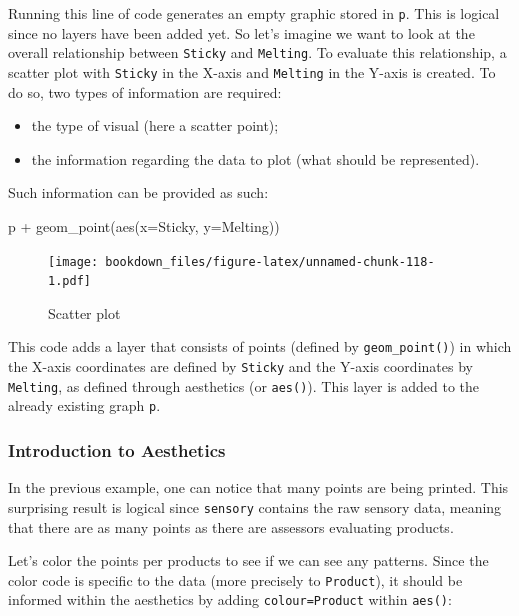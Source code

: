 \documentclass[
]{krantz}
\makeatletter
\newenvironment{Shaded}{\begin{snugshade}}{\end{snugshade}}
\newcommand{\AttributeTok}[1]{\textcolor[rgb]{0.61,0.61,0.61}{#1}}
\newcommand{\FunctionTok}[1]{\textcolor[rgb]{0,0,0}{#1}}
\newcommand{\NormalTok}[1]{#1}
\newcommand{\SpecialCharTok}[1]{\textcolor[rgb]{0,0,0}{#1}}
\providecommand{\tightlist}{%
  \setlength{\itemsep}{0pt}\setlength{\parskip}{0pt}}
\newenvironment{kframe}{%
\medskip{}
\setlength{\fboxsep}{.8em}
 \def\at@end@of@kframe{}%
 \ifinner\ifhmode%
  \def\at@end@of@kframe{\end{minipage}}%
  \begin{minipage}{\columnwidth}%
 \fi\fi%
 \def\FrameCommand##1{\hskip\@totalleftmargin \hskip-\fboxsep
 \colorbox{shadecolor}{##1}\hskip-\fboxsep
     \hskip-\linewidth \hskip-\@totalleftmargin \hskip\columnwidth}%
 \MakeFramed {\advance\hsize-\width
   \@totalleftmargin\z@ \linewidth\hsize
   \@setminipage}}%
 {\par\unskip\endMakeFramed%
 \at@end@of@kframe}
\renewenvironment{Shaded}{\begin{kframe}}{\end{kframe}}
\makeatother
\begin{document}
Running this line of code generates an empty graphic stored in \texttt{p}. This is logical since no layers have been added yet.
So let's imagine we want to look at the overall relationship between \texttt{Sticky} and \texttt{Melting}. To evaluate this relationship, a scatter plot with \texttt{Sticky} in the X-axis and \texttt{Melting} in the Y-axis is created. To do so, two types of information are required:

\begin{itemize}
\tightlist
\item
  the type of visual (here a scatter point);
\item
  the information regarding the data to plot (what should be represented).
\end{itemize}

Such information can be provided as such:

\begin{Shaded}
\begin{Highlighting}[]
\NormalTok{p }\SpecialCharTok{+} \FunctionTok{geom\_point}\NormalTok{(}\FunctionTok{aes}\NormalTok{(}\AttributeTok{x=}\NormalTok{Sticky, }\AttributeTok{y=}\NormalTok{Melting))}
\end{Highlighting}
\end{Shaded}

\begin{figure}
\centering
\texttt{[image: bookdown\_files/figure-latex/unnamed-chunk-118-1.pdf]}
\caption{\label{fig:unnamed-chunk-118}Scatter plot}
\end{figure}

This code adds a layer that consists of points (defined by \texttt{geom\_point()}) in which the X-axis coordinates are defined by \texttt{Sticky} and the Y-axis coordinates by \texttt{Melting}, as defined through aesthetics (or \texttt{aes()}). This layer is added to the already existing graph \texttt{p}.

\hypertarget{scatter}{%
\subsubsection*{Introduction to Aesthetics}\label{scatter}}


In the previous example, one can notice that many points are being printed. This surprising result is logical since \texttt{sensory} contains the raw sensory data, meaning that there are as many points as there are assessors evaluating products.

Let's color the points per products to see if we can see any patterns. Since the color code is specific to the data (more precisely to \texttt{Product}), it should be informed within the aesthetics by adding \texttt{colour=Product} within \texttt{aes()}:
\end{document}
